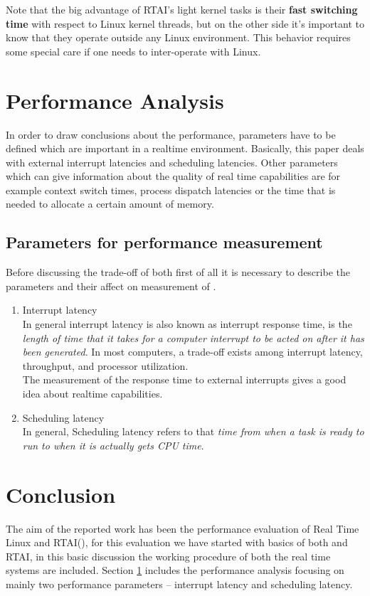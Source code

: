 Note that the big advantage of RTAI's light kernel tasks is their \textbf{fast switching time} with respect to Linux kernel threads, but on the other side it's important to know that they operate outside any Linux environment. This behavior requires some special care if one needs to inter-operate with Linux.

\section{Performance Analysis}\label{sec:performance-analysis}
In order to draw conclusions about the performance, parameters have to be defined which are important in a realtime environment. Basically, this paper deals with external interrupt latencies and scheduling latencies. Other parameters which can give information about the quality of real time capabilities are for example context switch times, process dispatch latencies or the time that is needed to allocate a certain amount of memory. 

\subsection{Parameters for performance measurement}
Before discussing the trade-off of both \rtos \space first of all it is necessary to describe the parameters and their affect on measurement of \rtos.
\begin{enumerate}
    \item Interrupt latency
        \\ In general interrupt latency is also known as interrupt response time, is the \textit{length of time that it takes for a computer interrupt to be acted on after it has been generated}. In most computers, a trade-off exists among interrupt latency, throughput, and processor utilization.
        \\ The measurement of the response time to external interrupts gives a good idea about realtime capabilities.
    \item Scheduling latency
        \\ In general, Scheduling latency refers to that \textit{time from when a task is ready to run to when it is actually gets CPU time}. 
\end{enumerate}



\section{Conclusion}
The aim of the reported work has been the  performance evaluation of Real Time Linux and RTAI(\rtai), for this evaluation we have started with basics of both \rtlinux \space and RTAI, in this basic discussion the working procedure of both the real time systems are included. Section \ref{sec:performance-analysis} includes the performance analysis focusing on mainly two performance parameters -- interrupt latency and scheduling latency.